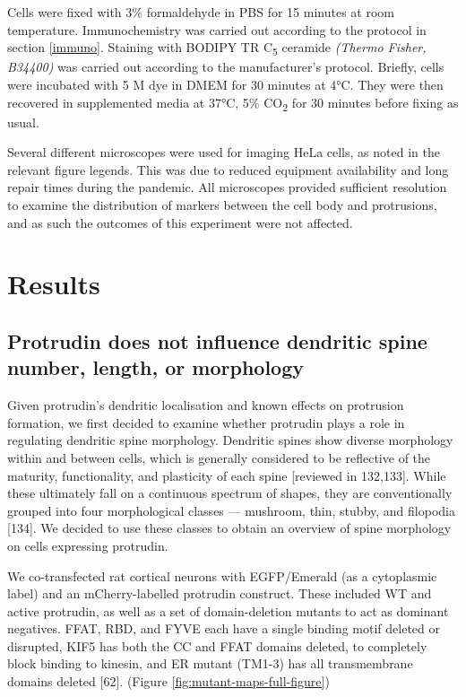 \documentclass[
  12pt,
  a4paper,
]{book}
\begin{document}
Cells were fixed with 3\% formaldehyde in PBS for 15 minutes at room temperature. Immunochemistry was carried out according to the protocol in section \ref{immuno}. Staining with BODIPY TR C\textsubscript{5} ceramide \emph{(Thermo Fisher, B34400)} was carried out according to the manufacturer's protocol. Briefly, cells were incubated with 5 \textmu{}M dye in DMEM for 30 minutes at 4°C. They were then recovered in supplemented media at 37°C, 5\% CO\textsubscript{2} for 30 minutes before fixing as usual.

Several different microscopes were used for imaging HeLa cells, as noted in the relevant figure legends. This was due to reduced equipment availability and long repair times during the pandemic. All microscopes provided sufficient resolution to examine the distribution of markers between the cell body and protrusions, and as such the outcomes of this experiment were not affected.

\section{Results}\label{results-1}

\subsection{Protrudin does not influence dendritic spine number, length, or morphology}\label{protrudin-does-not-influence-dendritic-spine-number-length-or-morphology}

Given protrudin's dendritic localisation and known effects on protrusion formation, we first decided to examine whether protrudin plays a role in regulating dendritic spine morphology. Dendritic spines show diverse morphology within and between cells, which is generally considered to be reflective of the maturity, functionality, and plasticity of each spine {[}reviewed in 132,133{]}. While these ultimately fall on a continuous spectrum of shapes, they are conventionally grouped into four morphological classes --- mushroom, thin, stubby, and filopodia {[}134{]}. We decided to use these classes to obtain an overview of spine morphology on cells expressing protrudin.

We co-transfected rat cortical neurons with EGFP/Emerald (as a cytoplasmic label) and an mCherry-labelled protrudin construct. These included WT and active protrudin, as well as a set of domain-deletion mutants to act as dominant negatives. \textDelta{}FFAT, \textDelta{}RBD, and \textDelta{}FYVE each have a single binding motif deleted or disrupted, \textDelta{}KIF5 has both the CC and FFAT domains deleted, to completely block binding to kinesin, and \textDelta{}ER mutant (\textDelta{}TM1-3) has all transmembrane domains deleted {[}62{]}. (Figure \ref{fig:mutant-maps-full-figure})
\end{document}

